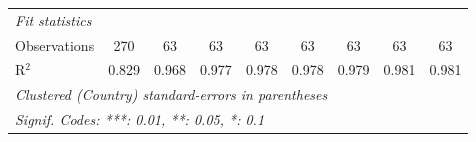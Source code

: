 \begin{table}[htbp]
\begin{tabular}{lcccccccc}
      \midrule \emph{Fit statistics}\\
      Observations                                                                     & 270     & 63      & 63             & 63             & 63             & 63             & 63             & 63\\  
      R$^2$                                                                            & 0.829   & 0.968   & 0.977          & 0.978          & 0.978          & 0.979          & 0.981          & 0.981\\  
      \midrule
      \multicolumn{9}{l}{\emph{Clustered (Country) standard-errors in parentheses}}\\
      \multicolumn{9}{l}{\emph{Signif. Codes: ***: 0.01, **: 0.05, *: 0.1}}\\
   \end{tabular}
\end{table}


